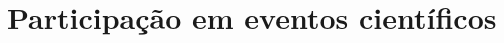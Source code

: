 \documentclass[12pt]{report}
\begin{document}
	{\let\clearpage\relax \chapter{Participação em eventos científicos}}\label{chp:particEvento}
	
	
	
	
	
	
	
	
	
\end{document}
